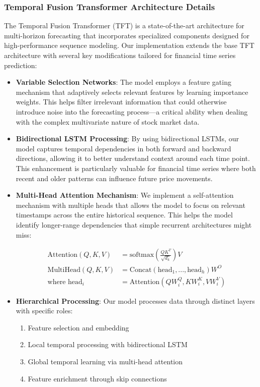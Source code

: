 \documentclass[conference]{IEEEtran}
\begin{document}
\subsubsection{Temporal Fusion Transformer Architecture Details}
The Temporal Fusion Transformer (TFT) is a state-of-the-art architecture for multi-horizon forecasting that incorporates specialized components designed for high-performance sequence modeling. Our implementation extends the base TFT architecture with several key modifications tailored for financial time series prediction:

\begin{itemize}
\item \textbf{Variable Selection Networks}: The model employs a feature gating mechanism that adaptively selects relevant features by learning importance weights. This helps filter irrelevant information that could otherwise introduce noise into the forecasting process—a critical ability when dealing with the complex multivariate nature of stock market data.

\item \textbf{Bidirectional LSTM Processing}: By using bidirectional LSTMs, our model captures temporal dependencies in both forward and backward directions, allowing it to better understand context around each time point. This enhancement is particularly valuable for financial time series where both recent and older patterns can influence future price movements.

\item \textbf{Multi-Head Attention Mechanism}: We implement a self-attention mechanism with multiple heads that allows the model to focus on relevant timestamps across the entire historical sequence. This helps the model identify longer-range dependencies that simple recurrent architectures might miss:

\begin{equation}
\begin{aligned}
\text{Attention}(Q, K, V) &= \text{softmax}\left(\frac{QK^T}{\sqrt{d_k}}\right)V \\
\text{MultiHead}(Q, K, V) &= \text{Concat}(\text{head}_1,...,\text{head}_h)W^O \\
\text{where head}_i &= \text{Attention}(QW_i^Q, KW_i^K, VW_i^V)
\end{aligned}
\end{equation}

\item \textbf{Hierarchical Processing}: Our model processes data through distinct layers with specific roles: 
  \begin{enumerate}
  \item Feature selection and embedding
  \item Local temporal processing with bidirectional LSTM
  \item Global temporal learning via multi-head attention
  \item Feature enrichment through skip connections
  \end{enumerate}


\end{itemize}
\end{document}
